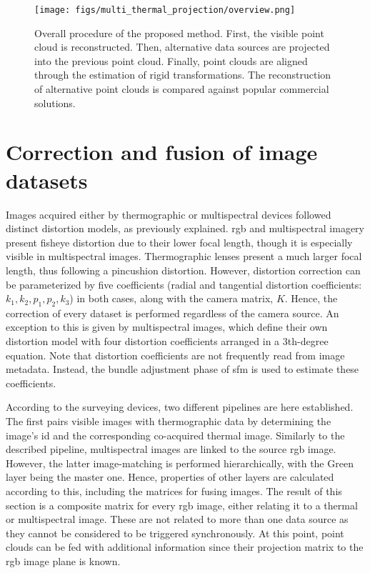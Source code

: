 \begin{figure}[ht]
    \centering
    \texttt{[image: figs/multi\_thermal\_projection/overview.png]}
    \caption{Overall procedure of the proposed method. First, the visible point cloud is reconstructed. Then, alternative data sources are projected into the previous point cloud. Finally, point clouds are aligned through the estimation of rigid transformations. The reconstruction of alternative point clouds is compared against popular commercial solutions. }
	\label{fig:multi_thermal_overview}
\end{figure}

\section{Correction and fusion of image datasets}

Images acquired either by thermographic or multispectral devices followed distinct distortion models, as previously explained. \acrshort{rgb} and multispectral imagery present fisheye distortion due to their lower focal length, though it is especially visible in multispectral images. Thermographic lenses present a much larger focal length, thus following a pincushion distortion. However, distortion correction can be parameterized by five coefficients (radial and tangential distortion coefficients: $k_1, k_2, p_1, p_2, k_3$) in both cases, along with the camera matrix, $K$. Hence, the correction of every dataset is performed regardless of the camera source. An exception to this is given by multispectral images, which define their own distortion model with four distortion coefficients arranged in a 3th-degree equation. Note that distortion coefficients are not frequently read from image metadata. Instead, the bundle adjustment phase of \acrshort{sfm} is used to estimate these coefficients. 

According to the surveying devices, two different pipelines are here established. The first pairs visible images with thermographic data by determining the image's id and the corresponding co-acquired thermal image. Similarly to the described pipeline, multispectral images are linked to the source \acrshort{rgb} image. However, the latter image-matching is performed hierarchically, with the Green layer being the master one. Hence, properties of other layers are calculated according to this, including the matrices for fusing images. The result of this section is a composite matrix for every \acrshort{rgb} image, either relating it to a thermal or multispectral image. These are not related to more than one data source as they cannot be considered to be triggered synchronously. At this point, point clouds can be fed with additional information since their projection matrix to the \acrshort{rgb} image plane is known. 

